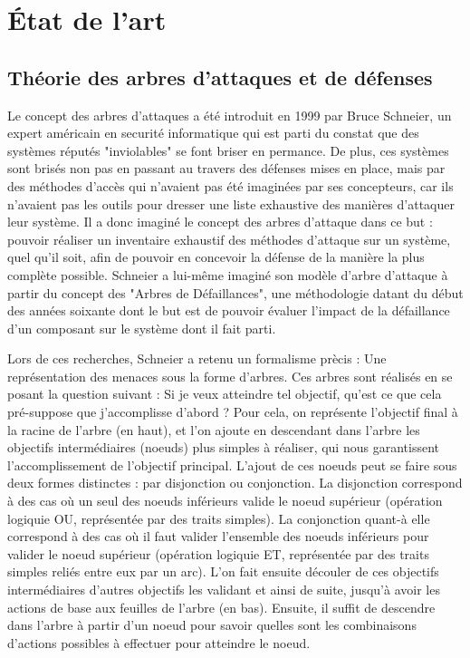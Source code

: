 \section{\'Etat de l'art}


	\subsection{Théorie des arbres d'attaques et de défenses}
		Le concept des arbres d'attaques a été introduit en 1999 par Bruce Schneier, un expert américain en securité informatique qui est parti du constat que des systèmes réputés "inviolables" se font briser en permance. De plus, ces systèmes sont brisés non pas en passant au travers des défenses mises en place, mais par des méthodes d'accès qui n'avaient pas été imaginées par ses concepteurs, car ils n'avaient pas les outils pour dresser une liste exhaustive des manières d'attaquer leur système. Il a donc imaginé le concept des arbres d'attaque dans ce but : pouvoir réaliser un inventaire exhaustif des méthodes d'attaque sur un système, quel qu'il soit, afin de pouvoir en concevoir la défense de la manière la plus complète possible. Schneier a lui-même imaginé son modèle d'arbre d'attaque à partir du concept des "Arbres de Défaillances", une méthodologie datant du début des années soixante dont le but est de pouvoir évaluer l'impact de la défaillance d'un composant sur le système dont il fait parti. 

		Lors de ces recherches, Schneier a retenu un formalisme prècis : Une représentation des menaces sous la forme d'arbres. Ces arbres sont réalisés en se posant la question suivant : Si je veux atteindre tel objectif, qu'est ce que cela pré-suppose que j'accomplisse d'abord ? Pour cela, on représente l'objectif final à la racine de l'arbre (en haut), et l'on ajoute en descendant dans l'arbre les objectifs intermédiaires (noeuds) plus simples à réaliser, qui nous garantissent l'accomplissement de l'objectif principal. L'ajout de ces noeuds peut se faire sous deux formes distinctes : par disjonction ou conjonction. La disjonction correspond à des cas où un seul des noeuds inférieurs valide le noeud supérieur (opération logiquie OU, représentée par des traits simples). La conjonction quant-à elle correspond à des cas où il faut valider l'ensemble des noeuds inférieurs pour valider le noeud supérieur (opération logiquie ET, représentée par des traits simples reliés entre eux par un arc). L'on fait ensuite découler de ces objectifs intermédiaires d'autres objectifs les validant et ainsi de suite, jusqu'à avoir les actions de base aux feuilles de l'arbre (en bas). Ensuite, il suffit de descendre dans l'arbre à partir d'un noeud pour savoir quelles sont les combinaisons d'actions possibles à effectuer pour atteindre le noeud. 

